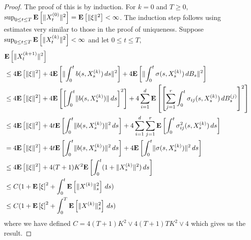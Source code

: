 \begin{proof}
The proof of this is by induction.  For $k=0$ and $T \geq 0$, $\sup_{0 \leq t \leq T} \textbf{E}\left[\lVert X^{(0)}_t \rVert^2\right] = \textbf{E}\left[\lVert \xi \rVert^2\right]< \infty$. 
The induction step follows using estimates very similar to those in the proof of uniqueness.  Suppose $\sup_{0 \leq t \leq T} \textbf{E}\left[\lVert X^{(k)}_t \rVert^2\right] < \infty$ and
let $0 \leq t \leq T$,
\begin{align*}
&\textbf{E}\left[\lVert X^{(k+1)}_t \rVert^2\right]  \\
&\leq
4 \textbf{E}\left[\lVert \xi \rVert^2\right]
+ 4 \textbf{E}\left[\lVert \int_0^t b(s,X^{(k)}_s) \, ds  \rVert^2\right]
+ 4 \textbf{E}\left[\lVert \int_0^t \sigma(s,X^{(k)}_s) \, dB_s \rVert^2\right] \\
&\leq
4 \textbf{E}\left[\lVert \xi \rVert^2\right]
+ 4 \textbf{E}\left[\left [ \int_0^t \lVert  b(s,X^{(k)}_s)  \rVert \, ds \right]^2\right]
+ 4 \sum_{i=1}^d \textbf{E}\left[ \left [ \sum_{j=1}^r \int_0^t \sigma_{ij}(s,X^{(k)}_s) \, dB^{(j)}_s\right ]^2\right] \\
&\leq
4 \textbf{E}\left[\lVert \xi \rVert^2\right]
+ 4t \textbf{E}\left[ \int_0^t \lVert  b(s,X^{(k)}_s)  \rVert^2 \, ds \right]
+ 4 \sum_{i=1}^d \sum_{j=1}^r \textbf{E}\left[ \int_0^t \sigma^2_{ij}(s,X^{(k)}_s) \, ds\right] \\
&=
4 \textbf{E}\left[\lVert \xi \rVert^2\right]
+ 4t \textbf{E}\left[ \int_0^t \lVert  b(s,X^{(k)}_s)  \rVert^2 \, ds \right]
+ 4 \textbf{E}\left[ \int_0^t \lVert \sigma(s,X^{(k)}_s) \rVert^2 \, ds\right] \\
&\leq
4 \textbf{E}\left[\lVert \xi \rVert^2\right]
+ 4(T+1)K^2 \textbf{E}\left[ \int_0^t (1 + \lVert X^{(k)}_s \rVert^2) \, ds \right] \\
&\leq C(1 + \textbf{E}\left[\xi\right]^2 + \int_0^t \textbf{E}\left[\lVert X^{(k)} \rVert_s^2\right] \, ds)  \\
&\leq C(1 + \textbf{E}\left[\xi\right]^2 + \int_0^T \textbf{E}\left[\lVert X^{(k)} \rVert_s^2\right] \, ds) 
\end{align*}
where we have defined $C = 4(T+1)K^2 \vee 4(T+1)TK^2\vee 4$ which gives us the result.


\end{proof}
